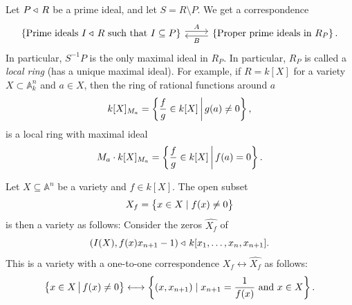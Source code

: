 \documentclass[11pt,a4paper]{article}
\newcommand{\A}{\mathbb A}
\begin{document}
\begin{example}
  Let $P \triangleleft\, R$ be a prime ideal,
  and let $S = R \setminus P$.
  We get a correspondence
  \[
    \begin{tikzcd}
      \set{
      \text{Prime ideals $I \idealin R$ such that $I \subseteq P$}}
      \arrow[r, shift left, "A"] &
      \set{\text{Proper prime ideals in $R_P$}}
      \arrow[l, shift left, "B"].
    \end{tikzcd}
  \]
  In particular, $S^{-1}P$ is the only maximal ideal in $R_P$.
  In particular, $R_P$ is called a \textit{local ring}
  (has a unique maximal ideal).
  For example, if $R = k[X]$ for a variety $X \subset \A_k^n$
  and $a \in X$,
  then the ring of rational functions around $a$
  \[
    k[X]_{M_a} =
    \left\{\frac{f}{g} \in k[X] \,\middle\vert\, g(a) \neq 0\right\},
  \]
  is a local ring with maximal ideal
  \[
    M_a \cdot k[X]_{M_a} =
    \left\{\frac{f}{g} \in k[X] \,\middle\vert\, f(a) = 0\right\}.
  \]
\end{example}

\begin{example}
  Let $X \subseteq \A^n$ be a variety and $f \in k[X]$.
  The open subset
  \[
    X_f = \left\{x \in X \mid f(x) \neq 0\right\}
  \]
  is then a variety as follows:
  Consider the zeros $\widehat{X_f}$ of
  \[
    (I(X),f(x) x_{n+1} - 1) \triangleleft\, k[x_1,\dots,x_n,x_{n+1}].
  \]
  This is a variety with a one-to-one correspondence
  $X_f \longleftrightarrow \widehat{X_f}$
  as follows:
  \[
    \left\{x \in X \,\middle\vert\, f(x) \neq 0\right\} \longleftrightarrow
    \left\{(x,x_{n+1}) \mid x_{n+1} = \frac{1}{f(x)} \text{ and } x \in X\right\}.
  \]
\end{example}
\end{document}
